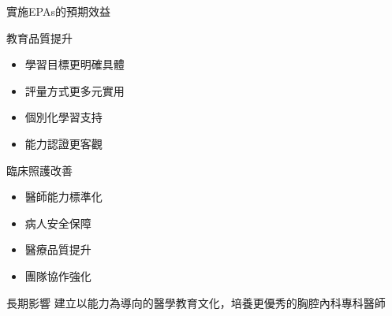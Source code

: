 \documentclass[aspectratio=169]{beamer}
\begin{document}
\begin{frame}{實施EPAs的預期效益}
\begin{block}{教育品質提升}
\begin{itemize}
\item 學習目標更明確具體
\item 評量方式更多元實用
\item 個別化學習支持
\item 能力認證更客觀
\end{itemize}
\end{block}

\begin{block}{臨床照護改善}
\begin{itemize}
\item 醫師能力標準化
\item 病人安全保障
\item 醫療品質提升
\item 團隊協作強化
\end{itemize}
\end{block}

\begin{alertblock}{長期影響}
建立以能力為導向的醫學教育文化，培養更優秀的胸腔內科專科醫師
\end{alertblock}
\end{frame}
\end{document}

